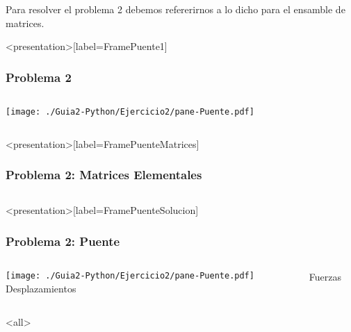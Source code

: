 Para resolver el problema 2 debemos refererirnos a lo dicho para el
ensamble de matrices.

\mode*
\begin{frame}<presentation>[label=FramePuente1]
    \frametitle{Problema 2}
    \begin{columns}
        \texttt{[image: ./Guia2-Python/Ejercicio2/pane-Puente.pdf]}
        \begin{codeblock}
            
        \end{codeblock}
    \end{columns}
\end{frame}

\begin{frame}<presentation>[label=FramePuenteMatrices]
    \frametitle{Problema 2: Matrices Elementales}
    \begin{columns}
    \end{columns}
\end{frame}

\begin{frame}<presentation>[label=FramePuenteSolucion]
    \frametitle{Problema 2: Puente}
    \begin{columns}
            \texttt{[image: ./Guia2-Python/Ejercicio2/pane-Puente.pdf]}
        Desplazamientos

        \begin{codeblock}
            
        \end{codeblock}
        Fuerzas

        \begin{codeblock}
            
        \end{codeblock}
    \end{columns}
\end{frame}
\mode<all>
